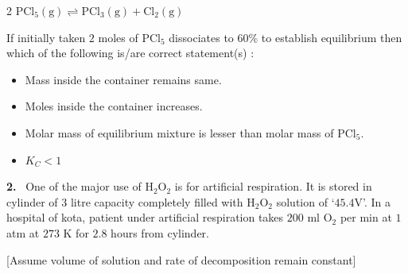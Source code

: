 \documentclass[10pt]{extarticle}
\newcommand{\qn}[1]{\par\smallskip\noindent\textbf{#1.}~}
\newenvironment{qoptions}{\begin{itemize}[leftmargin=1.8em,itemsep=1pt,topsep=2pt,label={}]}{\end{itemize}}
\newcommand{\opt}[2]{\item[(#1)] #2}
\begin{document}
\begin{multicols}{2}
$\mathrm{PCl_5(g)\rightleftharpoons PCl_3(g)+Cl_2(g)}$

If initially taken $2$ moles of $\mathrm{PCl_5}$ dissociates to $60\%$ to establish equilibrium then which of the following is/are correct statement(s) :
\begin{qoptions}
\opt{A}{Mass inside the container remains same.}
\opt{B}{Moles inside the container increases.}
\opt{C}{Molar mass of equilibrium mixture is lesser than molar mass of $\mathrm{PCl_5}$.}
\opt{D}{$K_C<1$}
\end{qoptions}
\qn{2} One of the major use of $\mathrm{H_2O_2}$ is for artificial respiration. It is stored in cylinder of $3$ litre capacity completely filled with $\mathrm{H_2O_2}$ solution of `$45.4$V'. In a hospital of kota, patient under artificial respiration takes $200$ ml $\mathrm{O_2}$ per min at $1$ atm at $273$ K for $2.8$ hours from cylinder.

[Assume volume of solution and rate of decomposition remain constant]


\end{multicols}
\end{document}
